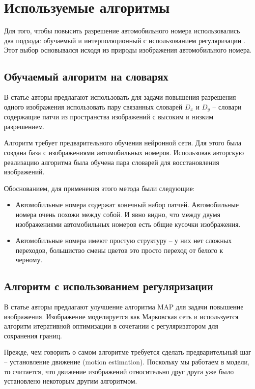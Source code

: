 \section{Используемые алгоритмы}
Для того, чтобы повысить разрешение автомобильного номера использовались два подхода: обучаемый \cite{yang2012coupled} и
интерполяционный с использованием регуляризации \cite{suresh2007superresolution}. Этот выбор основывался исходя из
природы изображения автомобильного номера.

\subsection{Обучаемый алгоритм на словарях}
\label{sr1}
В статье \cite{yang2012coupled} авторы предлагают использовать для задачи повышения разрешения одного изображения
использовать пару связанных словарей $D_x$ и $D_y$ -- словари содержащие патчи из пространства изображений
с высоким и низким разрешением.

Алгоритм требует предварительного обучения нейронной сети. Для этого была создана база с изображениями автомобильных
номеров. Использовав авторскую реализацию алгоритма была обучена пара словарей для восстановления изображений.

Обоснованием, для применения этого метода были следующие:
\begin{itemize}
  \item Автомобильные номера содержат конечный набор патчей. Автомобильные номера очень похожи между собой. И явно
    видно, что между двумя изображениями автомобильных номеров есть общие кусочки изображения.
  \item Автомобильные номера имеют простую структуру -- у них нет сложных переходов, большиство смены цветов это просто
    переход от белого к черному.
\end{itemize}

\subsection{Алгоритм с использованием регуляризации}
\label{sr2}
В статье \cite{yuan2008fast} авторы предлагают улучшение алгоритма MAP для задачи повышение изображения. Изображение
моделируется как Марковская сеть и используется алгоритм итеративной оптимизации в сочетании с
регуляризатором для сохранения границ.

Прежде, чем говорить о самом алгоритме требуется сделать предварительный шаг -- установление движение (motion
estimation). Поскольку мы работаем в модели, то считается, что движение изображений относительно друг друга уже было
установлено некоторым другим алгоритмом.


